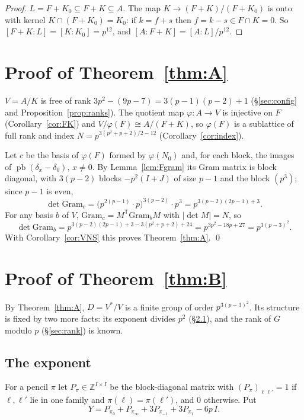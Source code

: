 \documentclass[11pt]{article}
\theoremstyle{definition}
\theoremstyle{remark}
\newcommand{\Z}{\mathbb{Z}}
\newcommand{\pb}{\operatorname{pb}}
\newcommand{\SAT}{K_0}
\begin{document}
\begin{proof}
$L=F+\SAT\subseteq F+K\subseteq A$. The map $K\to(F+K)/(F+\SAT)$ is onto with kernel $K\cap(F+\SAT)=\SAT$: if $k=f+s$ then $f=k-s\in F\cap K=0$. So $[F+K:L]=[K:\SAT]=p^{12}$, and $[A:F+K]=[A:L]/p^{12}$.
\end{proof}

\section{Proof of Theorem~\ref{thm:A}}\label{sec:proofA}

$V=A/K$ is free of rank $3p^2-(9p-7)=3(p-1)(p-2)+1$ (\S\ref{sec:config} and Proposition~\ref{prop:ranks}). The quotient map $\varphi:A\to V$ is injective on $F$ (Corollary~\ref{cor:FK}) and $V/\varphi(F)\cong A/(F+K)$, so $\varphi(F)$ is a sublattice of full rank and index $N=p^{3(p^2+p+2)/2-12}$ (Corollary~\ref{cor:index}).

Let $c$ be the basis of $\varphi(F)$ formed by $\varphi(N_0)$ and, for each block, the images of $\pb(\delta_x-\delta_0)$, $x\neq0$. By Lemma~\ref{lem:Fgram} its Gram matrix is block diagonal, with $3(p-2)$ blocks $-p^2(I+J)$ of size $p-1$ and the block $(p^3)$; since $p-1$ is even,
\[
\det\mathrm{Gram}_c=\big(p^{2(p-1)}\cdot p\big)^{3(p-2)}\cdot p^3=p^{3(p-2)(2p-1)+3}.
\]
For any basis $b$ of $V$, $\mathrm{Gram}_c=M^{\mathsf T}\mathrm{Gram}_bM$ with $|\det M|=N$, so
\[
\det\mathrm{Gram}_b=p^{3(p-2)(2p-1)+3-3(p^2+p+2)+24}=p^{3p^2-18p+27}=p^{3(p-3)^2}.
\]
With Corollary~\ref{cor:VNS} this proves Theorem~\ref{thm:A}. \qed

\section{Proof of Theorem~\ref{thm:B}}\label{sec:proofB}

By Theorem~\ref{thm:A}, $D=V^\ast/V$ is a finite group of order $p^{3(p-3)^2}$. Its structure is fixed by two more facts: its exponent divides $p^2$ (\S\ref{sec:exp}), and the rank of $G$ modulo $p$ (\S\ref{sec:rank}) is known.

\subsection{The exponent}\label{sec:exp}

For a pencil $\pi$ let $P_\pi\in\Z^{I\times I}$ be the block-diagonal matrix with $(P_\pi)_{\ell\ell'}=1$ if ${\ell},{\ell'}$ lie in one family and $\pi({\ell})=\pi({\ell'})$, and $0$ otherwise. Put
\[
Y=P_{\pi_0}+P_{\pi_\infty}+3P_{\pi_{-1}}+3P_{\pi_1}-6p\,I .
\]
\end{document}
